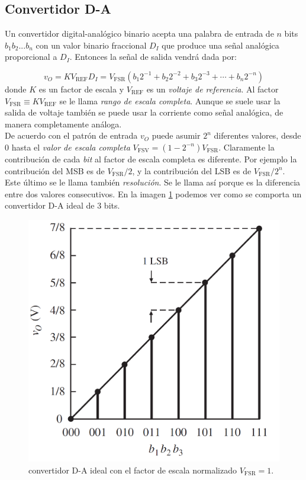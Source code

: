 \documentclass[12pt,a4paper]{article}
\numberwithin{equation}{section}
\numberwithin{figure}{section}
\newcommand{\REF}{\mathrm{REF}}
\newcommand{\FSR}{\mathrm{FSR}}
\newcommand{\FSV}{\mathrm{FSV}}
\begin{document}
\subsection{Convertidor D-A}

Un convertidor digital-analógico binario acepta una palabra de entrada de $n$ bits $b_1 b_2...b_n$ con un valor binario fraccional $D_I$ que produce una señal analógica proporcional a $D_I$. Entonces la señal de salida vendrá dada por:

\begin{equation}
v_O = K V_{\mathrm{REF}} D_I = V_\FSR (b_1 2^{-1} + b_2 2^{-2} + b_3 2^{-3} + \cdots + b_n 2^{-n})
\end{equation}
donde $K$ es un factor de escala y $V_\REF$ es un \textit{voltaje de referencia}. Al factor $V_\FSR \equiv K V_\REF$ se le llama \textit{rango de escala completa}. Aunque se suele usar la salida de voltaje también se puede usar la corriente como señal analógica, de manera completamente análoga. \\

De acuerdo con el patrón de entrada $v_O$ puede asumir $2^n$ diferentes valores, desde 0 hasta el \textit{valor de escala completa} $V_\FSV = (1-2^{-n}) V_\FSR$. Claramente la contribución de cada \textit{bit} al factor de escala completa es diferente. Por ejemplo la contribución del MSB es de $V_\FSR /2$, y la contribución del LSB es de $V_\FSR / 2^{n}$. Este último se le llama también \textit{resolución}. Se le llama así porque es la diferencia entre dos valores consecutivos.  En la imagen \ref{Fig:3.01} podemos ver como se comporta un convertidor D-A ideal de 3 bits.   \\

\begin{figure}[h!] \centering
\includegraphics[scale=0.35]{3.1-Ideal.png}
\caption{convertidor D-A ideal con el factor de escala normalizado $V_\FSR = 1$.}
\label{Fig:3.01}
\end{figure} 
\end{document}
